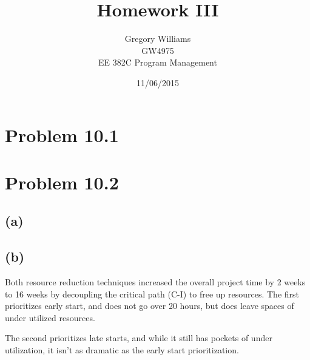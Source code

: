 \documentclass{article}
\title{Homework III}
\author{Gregory Williams\\GW4975\\EE 382C Program Management}
\date{11/06/2015}
\begin{document}
	\maketitle
	\section*{Problem 10.1}
	
		
	\section*{Problem 10.2}
	\subsection*{(a)}
		
		
	\subsection*{(b)}
	Both resource reduction techniques increased the overall project time by 2 weeks to 16 weeks by decoupling the critical path (C-I) to free up resources. The first prioritizes early start, and does not go over 20 hours, but does leave spaces of under utilized resources.
	
	The second prioritizes late starts, and while it still has pockets of under utilization, it isn't as dramatic as the early start prioritization.
	\pagebreak
\end{document}
